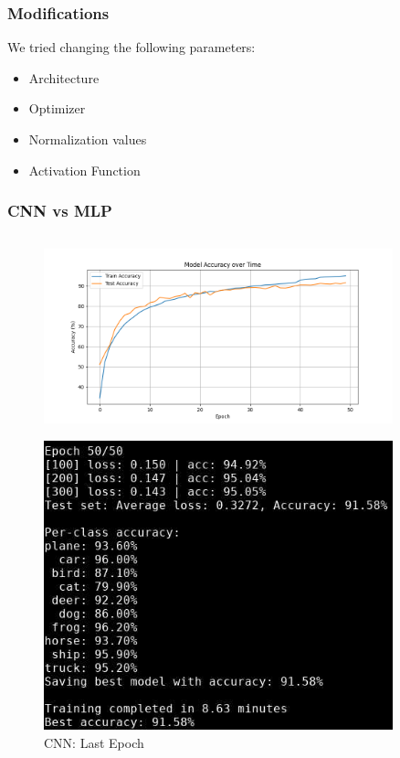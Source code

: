\documentclass{beamer}
\begin{document}
\begin{frame}
\frametitle{Modifications}
We tried changing the following parameters:
\begin{itemize}
    \item Architecture
    \item Optimizer
    \item Normalization values
    \item Activation Function
\end{itemize}
\end{frame}

\begin{frame}
\frametitle{CNN vs MLP}
\begin{columns}
    \begin{column}{0.5\textwidth}
        \begin{figure}[t]
            \centering
            \vspace{-0.4cm}
            \includegraphics[width=0.9\textwidth]{media/cifar10_cnn_accuracy.png}
        \end{figure}
        \vspace{-0.8cm}
        \begin{figure}[t]
            \centering
            \includegraphics[width=0.9\textwidth]{media/cnn_epoch_50.png}
            \vspace{-0.3cm}
            \caption{CNN: Last Epoch}
        \end{figure}
    \end{column}


\end{columns}
\end{frame}
\end{document}
